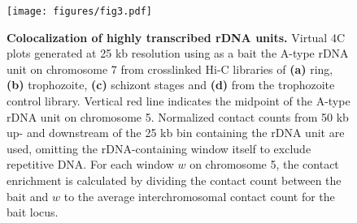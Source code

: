  
 \begin{figure}[h]
 \centering
\texttt{[image: figures/fig3.pdf]}

 \caption{{\bf Colocalization of highly transcribed rDNA units.} 
  Virtual 4C plots generated at 25 kb resolution using as a bait the A-type
  rDNA unit on chromosome 7 from crosslinked Hi-C libraries of \textbf{(a)}
  ring, \textbf{(b)} trophozoite, \textbf{(c)} schizont stages and
  \textbf{(d)} from the trophozoite control library. Vertical red line
  indicates the midpoint of the A-type rDNA unit on chromosome 5. Normalized
  contact counts from 50 kb up- and downstream of the 25 kb bin containing the
  rDNA unit are used, omitting the rDNA-containing window itself to exclude
  repetitive DNA. For each window $w$ on chromosome 5, the contact enrichment
  is calculated by dividing the contact count between the bait and $w$ to the
  average interchromosomal contact count for the bait locus.
  }
  \label{fig:fig3}
  \end{figure}



